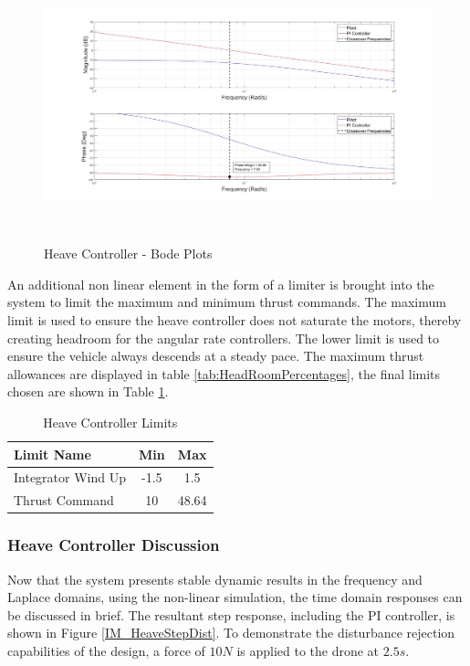 	 \begin{figure}[H]
	 	\centering
	 	\includegraphics[height = 7.9cm]{../Design/Matlab/Controllers/heave_bode.jpg}
	 	\caption{Heave Controller -  Bode Plots}
	 	\label{IM_HeaveControlBode}
	 \end{figure}
	 
	 An additional non linear element in the form of a limiter is brought into the system to limit the maximum and minimum thrust commands. The maximum limit is used to ensure the heave controller does not saturate the motors, thereby creating headroom for the angular rate controllers. The lower limit is used to ensure the vehicle always descends at a steady pace. The maximum thrust allowances are displayed in table \ref{tab:HeadRoomPercentages}, the final limits chosen are shown in Table \ref{tab:HeaveLimits}.
	 
	 \begin{table}[!]
	 	\centering
	 	\begin{tabular}{l | c | c |}
	 		Limit Name 				& Min & Max\\
	 		\hline\hline
	 		Integrator Wind Up 	   	& -1.5 	& 1.5 \\
	 		Thrust Command 		    & 10	& 48.64 \\
	 	\end{tabular}
	 	\caption{Heave Controller Limits}
	 	\label{tab:HeaveLimits}
	 \end{table}
	 
		 \subsubsection{Heave Controller Discussion}
		 Now that the system presents stable dynamic results in the frequency and Laplace domains, using the non-linear simulation, the time domain responses can be discussed in brief. The resultant step response, including the PI controller, is shown in Figure \ref{IM_HeaveStepDist}. To demonstrate the disturbance rejection capabilities of the design, a force of $10N$ is applied to the drone at $2.5s$.
		 
